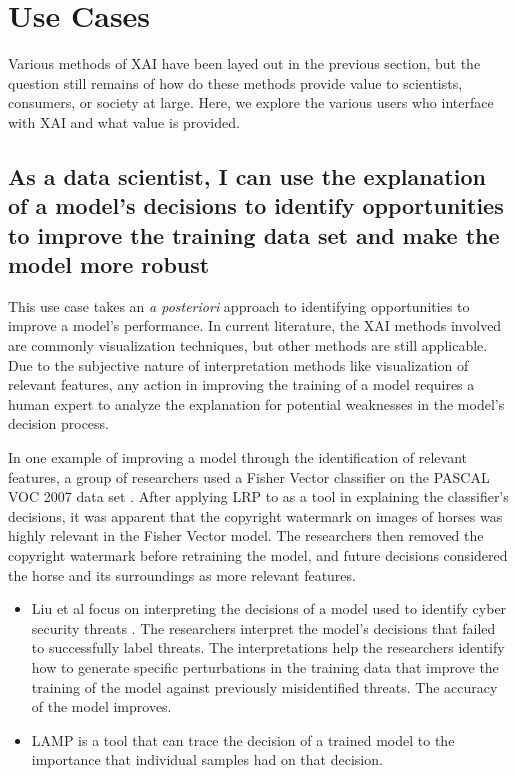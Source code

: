 \section{Use Cases} \label{sec:UseCases}

Various methods of XAI have been layed out in the previous section, but the question still remains of how do these methods provide value to scientists, consumers, or society at large.  Here, we explore the various users who interface with XAI and what value is provided.

\subsection{As a data scientist, I can use the explanation of a model's decisions to identify opportunities to improve the training data set and make the model more robust}

This use case takes an \textit{a posteriori} approach to identifying opportunities to improve a model's performance.  In current literature, the XAI methods involved are commonly visualization techniques, but other methods are still applicable.  Due to the subjective nature of interpretation methods like visualization of relevant features, any action in improving the training of a model requires a human expert to analyze the explanation for potential weaknesses in the model's decision process.

In one example of improving a model through the identification of relevant features, a group of researchers used a Fisher Vector classifier on the PASCAL VOC 2007 data set \cite{Bach2016AnalyzingCF}.  After applying LRP to as a tool in explaining the classifier's decisions, it was apparent that the copyright watermark on images of horses was highly relevant in the Fisher Vector model.  The researchers then removed the copyright watermark before retraining the model, and future decisions considered the horse and its surroundings as more relevant features.

\begin{itemize}
    \item Liu et al focus on interpreting the decisions of a model used to identify cyber security threats \cite{Liu:2018:ADM:3219819.3220027}.  The researchers interpret the model's decisions that failed to successfully label threats.  The interpretations help the researchers identify how to generate specific perturbations in the training data that improve the training of the model against previously misidentified threats.  The accuracy of the model improves.
    \item LAMP is a tool that can trace the decision of a trained model to the importance that individual samples had on that decision. \cite{Ma2017}
\end{itemize}

